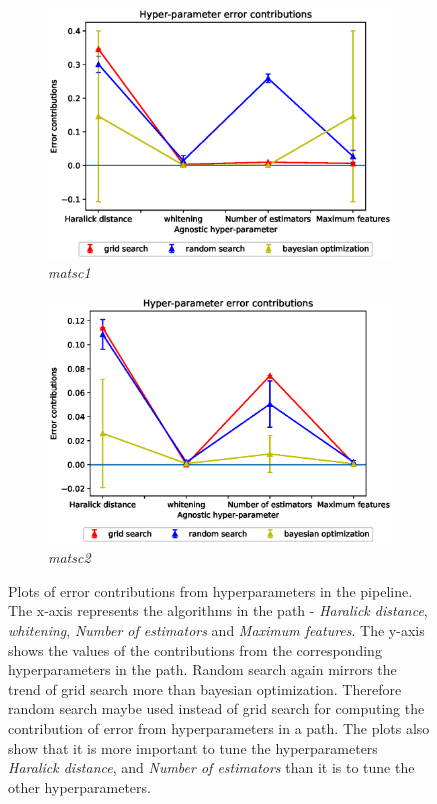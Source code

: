 \begin{figure}[ht!]
\begin{subfigure}{.5\textwidth}
  \includegraphics[scale=0.37]{img/EP/agnostic_error_hyper_matsc_dataset1.eps}
  \caption{\textit{matsc1}}
  \label{fig:eq_hyper_matsc1}
\end{subfigure}%
\begin{subfigure}{.5\textwidth}
  \centering
  \includegraphics[scale=0.37]{img/EP/agnostic_error_hyper_matsc_dataset2.eps}
  \caption{\textit{matsc2}}
  \label{fig:eq_hyper_matsc2}
\end{subfigure}

\caption{Plots of error contributions from hyperparameters in the pipeline. The x-axis represents the algorithms in the path - \textit{Haralick distance}, \textit{whitening}, \textit{Number of estimators} and \textit{Maximum features}. The y-axis shows the values of the contributions from the corresponding hyperparameters in the path. Random search again mirrors the trend of grid search more than bayesian optimization. Therefore random search maybe used instead of grid search for computing the contribution of error from hyperparameters in a path. The plots also show that it is more important to tune the hyperparameters \textit{Haralick distance}, and \textit{Number of estimators} than it is to tune  the other hyperparameters.}
\label{fig:eq_hyper}
\end{figure}
